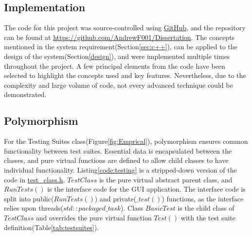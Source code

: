 \begin{center}
\section{Implementation}
\label{Implementation}
\end{center}

The code for this project was source-controlled using \href{https://github.com/}{GitHub}, and the repository can be found at \url{https://github.com/AndrewF001/Dissertation}. The concepts mentioned in the system requirement(Section\ref{sec:c++}), can be applied to the design of the system(Section\ref{design}), and were implemented multiple times throughout the project. A few principal elements from the code have been selected to highlight the concepts used and key features. Nevertheless, due to the complexity and large volume of code, not every advanced technique could be demonstrated.

\subsection{Polymorphism}

For the Testing Suites class(Figure\ref{fig:Emprical}), polymorphism ensures common functionality between test suites. Essential data is encapsulated between the classes, and pure virtual functions are defined to allow child classes to have individual functionality. Listing\ref{code:testing} is a stripped-down version of the code in \href{https://github.com/AndrewF001/Dissertation/blob/main/TSP_Solution/Empirical_Testing/Tests/test_class.h}{test\_class.h}. $TestClass$ is the pure virtual abstract parent class, and $RunTests()$ is the interface code for the GUI application. The interface code is split into public($RunTests()$) and private($\_test()$) functions, as the interface relies upon threads($std::packaged\_task$). Class $BasicTest$ is the child class of $TestClass$ and overrides the pure virtual function $Test()$ with the test suite definition(Table\ref{tab:testsuites}). 

